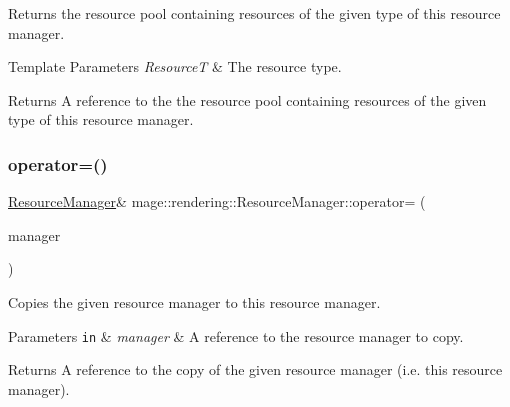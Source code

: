 Returns the resource pool containing resources of the given type of this resource manager.


\begin{DoxyTemplParams}{Template Parameters}
{\em ResourceT} & The resource type. \\
\hline
\end{DoxyTemplParams}
\begin{DoxyReturn}{Returns}
A reference to the the resource pool containing resources of the given type of this resource manager. 
\end{DoxyReturn}
\hypertarget{classmage_1_1rendering_1_1_resource_manager_a188467ab4e46176ee5184c9f5e5ac64f}{}\label{classmage_1_1rendering_1_1_resource_manager_a188467ab4e46176ee5184c9f5e5ac64f} 
\subsubsection{\texorpdfstring{operator=()}{operator=()}\hspace{0.1cm}{\footnotesize\ttfamily [1/2]}}
{\footnotesize\ttfamily \hyperlink{classmage_1_1rendering_1_1_resource_manager}{Resource\+Manager}\& mage\+::rendering\+::\+Resource\+Manager\+::operator= (\begin{DoxyParamCaption}\item[{const \hyperlink{classmage_1_1rendering_1_1_resource_manager}{Resource\+Manager} \&}]{manager }\end{DoxyParamCaption})\hspace{0.3cm}{\ttfamily [delete]}}

Copies the given resource manager to this resource manager.


\begin{DoxyParams}[1]{Parameters}
\mbox{\tt in}  & {\em manager} & A reference to the resource manager to copy. \\
\hline
\end{DoxyParams}
\begin{DoxyReturn}{Returns}
A reference to the copy of the given resource manager (i.\+e. this resource manager). 
\end{DoxyReturn}
\hypertarget{classmage_1_1rendering_1_1_resource_manager_a1e3f511409bcde3a7a3296364a0298f5}{}\label{classmage_1_1rendering_1_1_resource_manager_a1e3f511409bcde3a7a3296364a0298f5} 
